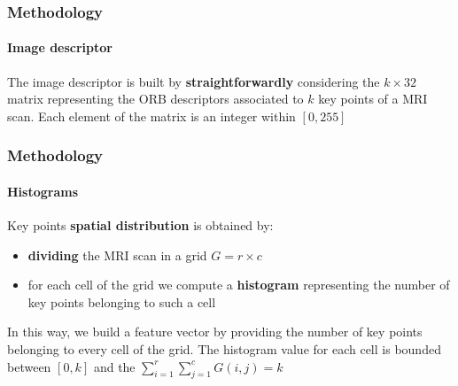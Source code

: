 \begin{frame}
	\frametitle{Methodology}
	\framesubtitle{Image descriptor}
	
	\Large
	
	\vspace{0.5cm}
	
	The image descriptor is built by \textbf{straightforwardly} considering the $ k \times 32 $ matrix
	representing the ORB descriptors associated to $ k $ key points of a MRI scan. Each element of the
	matrix is an integer within $ [0,255] $
	
	\begin{center}
	\end{center}
\end{frame}

\begin{frame}
	\frametitle{Methodology}
	\framesubtitle{Histograms}
	
	\Large
	
	\vspace{0.3cm}
	
	Key points \textbf{spatial distribution} is obtained by:
	
	\vspace{-0.1cm}
	
	\begin{itemize}
		\item \textbf{dividing} the MRI scan in a grid $ G = r \times c $ 
		\item for each cell of the grid we compute a \textbf{histogram} representing the number of key
			  points belonging to such a cell
	\end{itemize}
	
	In this way, we build a feature vector by providing the number of key points belonging to every
	cell of the grid. The histogram value for each cell is bounded between $ [0,k] $ and the $
	\sum_{i=1}^r \sum_{j=1}^c G(i,j) = k $
\end{frame}

